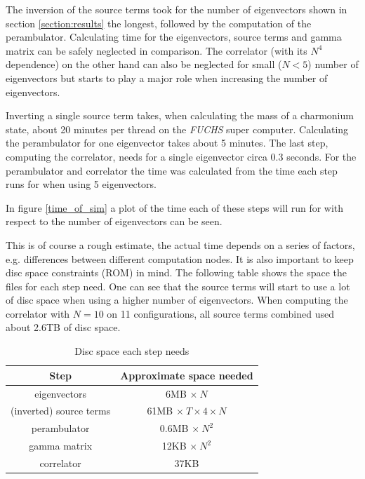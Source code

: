 \noindent
The inversion of the source terms took for the number of eigenvectors shown in section \ref{section:results} the longest, followed by the computation of the perambulator. Calculating time for the eigenvectors, source terms and gamma matrix can be safely neglected in comparison. The correlator (with its $N^4$ dependence) on the other hand can also be neglected for small ($N<5$) number of eigenvectors but starts to play a major role when increasing the number of eigenvectors.

Inverting a single source term takes, when calculating the mass of a charmonium state, about 20 minutes per thread on the \textit{FUCHS} super computer. Calculating the perambulator for one eigenvector takes about 5 minutes. The last step, computing the correlator, needs for a single eigenvector circa 0.3 seconds. For the perambulator and correlator the time was calculated from the time each step runs for when using 5 eigenvectors.

In figure \ref{time_of_sim} a plot of the time each of these steps will run for with respect to the number of eigenvectors can be seen.

This is of course a rough estimate, the actual time depends on a series of factors, e.g. differences between different computation nodes. It is also important to keep disc space constraints (ROM) in mind. The following table shows the space the files for each step need. One can see that the source terms will start to use a lot of disc space when using a higher number of eigenvectors. When computing the correlator with $N = 10$ on 11 configurations, all source terms combined used about 2.6TB of disc space.

\begin{table}[h]
            \centering
            \begin{tabular}{|c|c|}
            \hline
            \multicolumn{1}{|c|}{Step} & \multicolumn{1}{c|}{Approximate space needed} \\ \hline
             eigenvectors & 6MB $\times\ N$\\
             (inverted) source terms & 61MB $\times\ T \times 4 \times N$\\
             perambulator & 0.6MB $\times\ N^2$\\
             gamma matrix & 12KB $\times\ N^2$\\
             correlator & 37KB\\
              \hline
            \end{tabular}
            \caption{Disc space each step needs}
            \label{disc_space}
        \end{table}

